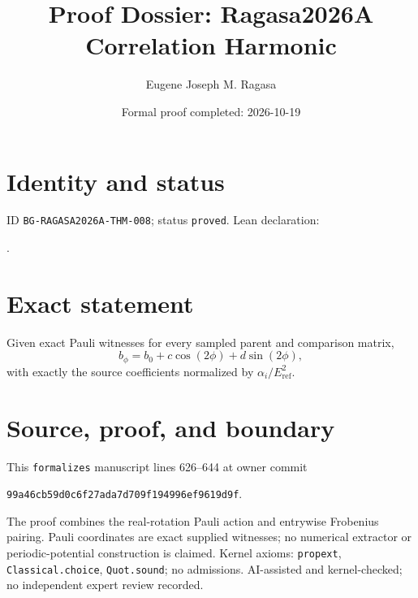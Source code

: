 \documentclass[11pt]{article}
\title{Proof Dossier: Ragasa2026A Correlation Harmonic}\author{Eugene Joseph M. Ragasa}\date{Formal proof completed: 2026-10-19}
\begin{document}
\maketitle
\section{Identity and status}
ID \texttt{BG-RAGASA2026A-THM-008}; status \texttt{proved}. Lean declaration:
\par{}.
\section{Exact statement}
Given exact Pauli witnesses for every sampled parent and comparison matrix,
\[b_\phi=b_0+c\cos(2\phi)+d\sin(2\phi),\]
with exactly the source coefficients normalized by $\alpha_i/E_{\mathrm{ref}}^2$.
\section{Source, proof, and boundary}
This \texttt{formalizes} manuscript lines 626--644 at owner commit
\begin{center}\small\texttt{99a46cb59d0c6f27ada7d709f194996ef9619d9f}.\end{center}
The proof combines the real-rotation
Pauli action and entrywise Frobenius pairing. Pauli coordinates are exact supplied
witnesses; no numerical extractor or periodic-potential construction is claimed.
Kernel axioms: \texttt{propext}, \texttt{Classical.choice}, \texttt{Quot.sound}; no
admissions. AI-assisted and kernel-checked; no independent expert review recorded.
\end{document}
